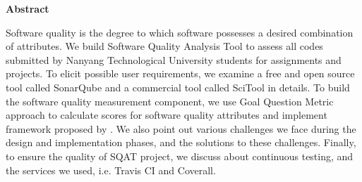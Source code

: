 
\begin{center}
    \textbf{\Huge Abstract}
\end{center}

Software quality is the degree to which software possesses a desired combination of attributes. We build Software Quality Analysis Tool to assess all codes submitted by Nanyang Technological University students for assignments and projects. To elicit possible user requirements, we examine a free and open source tool called SonarQube and a commercial tool called SciTool in details. To build the software quality measurement component, we use Goal Question Metric approach to calculate scores for software quality attributes and implement framework proposed by \cite{washizaki2007framework}. We also point out various challenges we face during the design and implementation phases, and the solutions to these challenges. Finally, to ensure the quality of SQAT project, we discuss about continuous testing, and the services we used, i.e. Travis CI and Coverall. 
